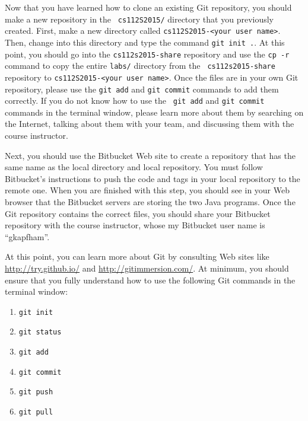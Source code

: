 Now that you have learned how to clone an existing Git repository, you should make a new repository in the {\tt
cs112S2015/} directory that you previously created.  First, make a new directory called {\tt cs112S2015-<your user
name>}. Then, change into this directory and type the command {\tt git init .}.  At this point, you should go into the
{\tt cs112s2015-share} repository and use the {\tt cp -r} command to copy the entire {\tt labs/} directory from the {\tt
cs112s2015-share} repository to {\tt cs112S2015-<your user name>}.  Once the files are in your own Git repository,
please use the {\tt git add} and {\tt git commit} commands to add them correctly. If you do not know how to use the {\tt
git add} and {\tt git commit} commands in the terminal window, please learn more about them by searching on the
Internet, talking about them with your team, and discussing them with the course instructor.

Next, you should use the Bitbucket Web site to create a repository that has the same name as the local directory and
local repository.  You must follow Bitbucket's instructions to push the code and tags in your local repository to the
remote one. When you are finished with this step, you should see in your Web browser that the Bitbucket servers are
storing the two Java programs. Once the Git repository contains the correct files, you should share your Bitbucket
repository with the course instructor, whose my Bitbucket user name is ``gkapfham''.

At this point, you can learn more about Git by consulting Web sites like \url{http://try.github.io/} and
\url{http://gitimmersion.com/}.  At minimum, you should ensure that you fully understand how to use the following Git
commands in the terminal window:

\begin{enumerate} 
                        
        \item {\tt git init}

        \item {\tt git status}

        \item {\tt git add} 

        \item {\tt git commit}

        \item {\tt git push}

        \item {\tt git pull} 

\end{enumerate}

